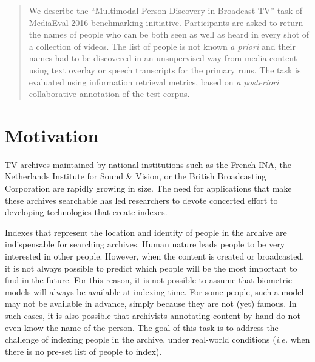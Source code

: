 \documentclass{acm_proc_article-me}
\begin{document}
\maketitle
\begin{abstract}
We describe the ``Multimodal Person Discovery in Broadcast TV'' task of MediaEval 2016 benchmarking initiative. Participants are asked to return the names of people who can be both seen as well as heard in every shot of a collection of videos. The list of people is not known \emph{a priori} and their names had to be discovered in an unsupervised way from media content using text overlay or speech transcripts for the primary runs. The task is evaluated using information retrieval metrics, based on \emph{a posteriori} collaborative annotation of the test corpus.
\end{abstract}

\vspace{-0.1cm}
\section{Motivation}

TV archives maintained by national institutions such as the French INA, the Netherlands Institute for Sound \& Vision, or the British Broadcasting Corporation are rapidly growing in size. The need for applications that make these archives searchable has led researchers to devote concerted effort to developing technologies that create indexes.

Indexes that represent the location and identity of people in the archive are indispensable for searching archives. Human nature leads people to be very interested in other people. However, when the content is created or broadcasted, it is not always possible to predict which people will be the most important to find in the future.
For this reason, it is not possible to assume that biometric models will always be available at indexing time. For some people, such a model may not be available in advance, simply because they are not (yet) famous. In such cases, it is also possible that archivists annotating content by hand do not even know the name of the person. The goal of this task is to address the challenge of indexing people in the archive, under real-world conditions (\emph{i.e.} when there is no pre-set list of people to index).
\end{document}
